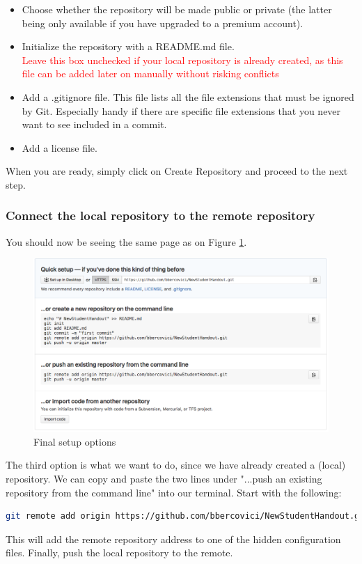 \documentclass{report}
\begin{document}
\begin{itemize}
\item Choose whether the repository will be made public or private (the latter being only available if you have upgraded to a premium account).
\item Initialize the repository with a README.md file. \\\textcolor{red}{Leave this box unchecked if your local repository is already created, as this file can be added later on manually without risking conflicts}
\item Add a .gitignore file. This file lists all the file extensions that must be ignored by Git. Especially handy if there are specific file extensions that you never want to see included in a commit.
\item Add a license file.
\end{itemize}
When you are ready, simply click on Create Repository and proceed to the next step.
\subsubsection{Connect the local repository to the remote repository}
You should now be seeing the same page as on Figure \ref{fig:setup_options}. 

\begin{figure}[H]
\centering
\includegraphics[scale=0.4]{setup_options}
\caption{Final setup options}
\label{fig:setup_options}
\end{figure}
The third option is what we want to do, since we have already created a (local) repository. We can copy and paste the two lines under "...push an existing repository from the command line" into our terminal. Start with the following:
\begin{lstlisting}[language=bash, caption=Add the remote repository location ]
git remote add origin https://github.com/bbercovici/NewStudentHandout.git
\end{lstlisting}
This will add the remote repository address to one of the hidden configuration files. Finally, push the local repository to the remote.
\end{document}
